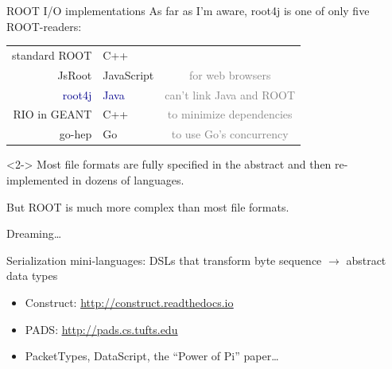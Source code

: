 \documentclass{beamer}
\begin{document}
\begin{frame}{ROOT I/O implementations}
\vspace{0.5 cm}
As far as I'm aware, root4j is one of only five ROOT-readers:

\begin{center}
\renewcommand{\arraystretch}{1.2}
\begin{tabular}{r | l c}
standard ROOT & C++ & \\
JsRoot        & JavaScript & \textcolor{gray}{for web browsers} \\
\textcolor{darkblue}{root4j}        & \textcolor{darkblue}{Java} & \textcolor{gray}{can't link Java and ROOT} \\
RIO in GEANT  & C++ & \textcolor{gray}{to minimize dependencies} \\
go-hep        & Go & \textcolor{gray}{to use Go's concurrency} \\
\end{tabular}
\end{center}

\vfill
\begin{uncoverenv}<2->
Most file formats are fully specified in the abstract and then re-implemented in dozens of languages.

\vspace{0.25 cm}
But ROOT is much more complex than most file formats.
\end{uncoverenv}
\end{frame}

\begin{frame}{Dreaming\ldots}
\vspace{0.5 cm}
\begin{block}{Serialization mini-languages:}
DSLs that transform byte sequence $\to$ abstract data types
\end{block}

\begin{itemize}
\item Construct: \textcolor{blue}{\underline{\url{http://construct.readthedocs.io}}}
\item PADS: \textcolor{blue}{\underline{\url{http://pads.cs.tufts.edu}}}
\item PacketTypes, DataScript, the ``Power of Pi'' paper\ldots                 
\end{itemize}

\vfill
{}

\vspace{0.25 cm}
\end{frame}
\end{document}
